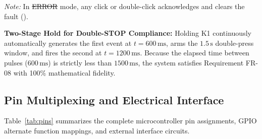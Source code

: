 \begin{table}[H]
  \centering
  \caption{Deterministic K1 multi-gesture mapping across operational states}
  \label{tab:k1map}
  \small
  \vspace{2pt}
  \raggedright\scriptsize\emph{Note:} In \st{ERROR} mode, any click or double-click acknowledges and clears the fault ().
\end{table}

\noindent \textbf{Two-Stage Hold for Double-STOP Compliance:} Holding K1 continuously automatically generates
the first  event at $t = 600\,\text{ms}$, arms the $1.5\,\text{s}$ double-press window, and fires
the second  at $t = 1200\,\text{ms}$. Because the elapsed time between pulses ($600\,\text{ms}$)
is strictly less than $1500\,\text{ms}$, the system satisfies Requirement FR-08 with 100\% mathematical fidelity.

\subsection{Pin Multiplexing and Electrical Interface}

Table~\ref{tab:pins} summarizes the complete microcontroller pin assignments, GPIO alternate function
mappings, and external interface circuits.


